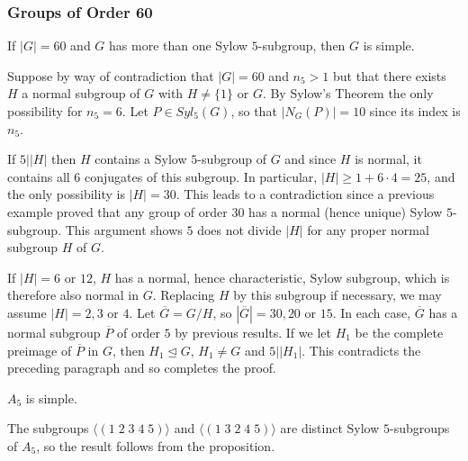 \documentclass[12pt, a4paper, twoside, openright, titlepage]{book}
\begin{document}
\subsubsection{Groups of Order 60}

\begin{prop}{}{}
    If $|G| = 60$ and $G$ has more than one Sylow $5$-subgroup, then $G$ is simple.
\end{prop}
\begin{proof*}{}{}
    Suppose by way of contradiction that $|G| = 60$ and $n_5 > 1$ but that there exists $H$ a normal subgroup of $G$ with $H \neq \{1\}$ or $G$. By Sylow's Theorem the only possibility for $n_5 = 6$. Let $P \in Syl_5(G)$, so that $|N_G(P)| = 10$ since its index is $n_5$.

    If $5\vert |H|$ then $H$ contains a Sylow $5$-subgroup of $G$ and since $H$ is normal, it contains all $6$ conjugates of this subgroup. In particular, $|H| \geq 1 + 6\cdot 4 = 25$, and the only possibility is $|H| = 30$. This leads to a contradiction since a previous example proved that any group of order $30$ has a normal (hence unique) Sylow $5$-subgroup. This argument shows $5$ does not divide $|H|$ for any proper normal subgroup $H$ of $G$.

    If $|H| = 6$ or $12$, $H$ has a normal, hence characteristic, Sylow subgroup, which is therefore also normal in $G$. Replacing $H$ by this subgroup if necessary, we may assume $|H| = 2,3$ or $4$. Let $\overline{G} = G/H$, so $|\overline{G}| = 30, 20$ or $15$. In each case, $\overline{G}$ has a normal subgroup $\overline{P}$ of order $5$ by previous results. If we let $H_1$ be the complete preimage of $\overline{P}$ in $G$, then $H_1 \trianglelefteq G$, $H_1 \neq G$ and $5\vert |H_1|$. This contradicts the preceding paragraph and so completes the proof.
\end{proof*}

\begin{cor}{}{}
    $A_5$ is simple.
\end{cor}
\begin{proof*}{}{}
    The subgroups $\langle (1\;2\;3\;4\;5)\rangle$ and $\langle (1\;3\;2\;4\;5)\rangle$ are distinct Sylow $5$-subgroups of $A_5$, so the result follows from the proposition.
\end{proof*}
\end{document}
